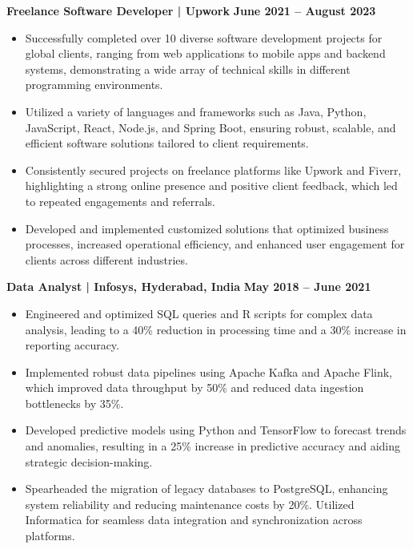 \documentclass{article}
\begin{document}
\vspace{1mm} 


\noindent \textbf{Freelance Software Developer | Upwork} \hfill \textbf{June 2021 – August 2023}
\begin{itemize}[noitemsep,nolistsep,leftmargin=*]
\item {\small Successfully completed over 10 diverse software development projects for global clients, ranging from web applications to mobile apps and backend systems, demonstrating a wide array of technical skills in different programming environments.}
\item {\small Utilized a variety of languages and frameworks such as Java, Python, JavaScript, React, Node.js, and Spring Boot, ensuring robust, scalable, and efficient software solutions tailored to client requirements.}
\item {\small Consistently secured projects on freelance platforms like Upwork and Fiverr, highlighting a strong online presence and positive client feedback, which led to repeated engagements and referrals.}
\item {\small Developed and implemented customized solutions that optimized business processes, increased operational efficiency, and enhanced user engagement for clients across different industries.}
\end{itemize}

\vspace{1mm} 

\noindent \textbf{Data Analyst | Infosys, Hyderabad, India} \hfill \textbf{May 2018 – June 2021}
\begin{itemize}[noitemsep,nolistsep,leftmargin=*]
\item {\small Engineered and optimized SQL queries and R scripts for complex data analysis, leading to a 40\% reduction in processing time and a 30\% increase in reporting accuracy.}
\item {\small Implemented robust data pipelines using Apache Kafka and Apache Flink, which improved data throughput by 50\% and reduced data ingestion bottlenecks by 35\%.}
\item {\small Developed predictive models using Python and TensorFlow to forecast trends and anomalies, resulting in a 25\% increase in predictive accuracy and aiding strategic decision-making.}
\item {\small Spearheaded the migration of legacy databases to PostgreSQL, enhancing system reliability and reducing maintenance costs by 20\%. Utilized Informatica for seamless data integration and synchronization across platforms.}
\end{itemize}
\end{document}
